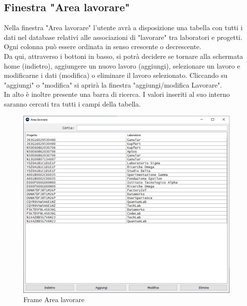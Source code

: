         \subsection {Finestra "Area lavorare"}
            Nella finestra "Area lavorare" l'utente avrà a disposizione una tabella con tutti i dati nel database relativi alle associazioni di "lavorare" tra laboratori e progetti. Ogni colonna può essere ordinata in senso crescente o decrescente.\\
            Da qui, attraverso i bottoni in basso, si potrà decidere se tornare alla schermata home (indietro), aggiungere un nuovo lavoro (aggiungi), selezionare un lavoro e modificarne i dati (modifica) o eliminare il lavoro selezionato. Cliccando su "aggiungi" o "modifica" si aprirà la finestra "aggiungi/modifica Lavorare".\\
            In alto è inoltre presente una barra di ricerca. I valori inseriti al suo interno saranno cercati tra tutti i campi della tabella.
            \begin{figure}[htbp!]
                \centering
                    \vspace{2\baselineskip}
                    \includegraphics[width=0.9\linewidth]{Immagini/Frames/Frame Area/Frame Area lavorare.png}
                \caption{Frame Area lavorare}
                \label{fig:Frame Area lavorare}
            \end{figure}

    \newpage

